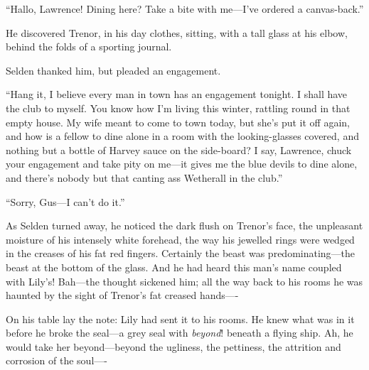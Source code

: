 \documentclass[12pt,a4paper]{book}
\begin{document}
``Hallo, Lawrence! Dining here? Take a bite with me---I've ordered a
canvas-back.''





He discovered Trenor, in his day clothes, sitting, with a tall
glass at his elbow, behind the folds of a sporting journal.





Selden thanked him, but pleaded an engagement.





``Hang it, I believe every man in town has an engagement tonight. 
I shall have the club to myself. You know how I'm living this
winter, rattling round in that empty house. My wife meant to come
to town today, but she's put it off again, and how is a fellow to
dine alone in a room with the looking-glasses covered, and
nothing but a bottle of Harvey sauce on the side-board? I say,
Lawrence, chuck your engagement and take pity on me---it gives me
the blue devils to dine alone, and there's nobody but
that canting ass Wetherall in the club.''





``Sorry, Gus---I can't do it.''





As Selden turned away, he noticed the dark flush on Trenor's
face, the unpleasant moisture of his intensely white forehead,
the way his jewelled rings were wedged in the creases of his fat
red fingers. Certainly the beast was predominating---the beast at
the bottom of the glass. And he had heard this man's name coupled
with Lily's! Bah---the thought sickened him; all the way back to
his rooms he was haunted by the sight of Trenor's fat creased
hands----





On his table lay the note: Lily had sent it to his rooms. He knew
what was in it before he broke the seal---a grey seal with \textit{beyond}!
beneath a flying ship. Ah, he would take her beyond---beyond the
ugliness, the pettiness, the attrition and corrosion of the
soul----
\end{document}
